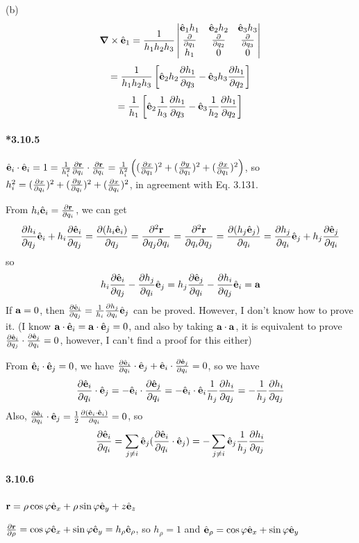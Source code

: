 \documentclass[a4paper]{article}
\begin{document}
(b) 
\[
\del\times\VE_1=\frac{1}{h_1h_2h_3}
\begin{vmatrix}
\VE_1h_1&\VE_2h_2&\VE_3h_3\\
\pdv{}{q_1}&\pdv{}{q_2}&\pdv{}{q_3}\\
h_1&0&0
\end{vmatrix}
\]
\[
=\frac{1}{h_1h_2h_3}\left[\VE_2h_2\pdv{h_1}{q_3}-\VE_3h_3\pdv{h_1}{q_2} \right]
\]
\[
=\frac{1}{h_1}\left[\VE_2\frac{1}{h_3}\pdv{h_1}{q_3}-\VE_3\frac{1}{h_2}\pdv{h_1}{q_2} \right]
\]

\paragraph{*3.10.5}
$\VE_i\cdot\VE_i=1=\frac{1}{h_i^2}\pdv{\V{r}}{q_i}\cdot\pdv{\V{r}}{q_i}=\frac{1}{h_i^2}\left((\pdv{x}{q_1})^2+(\pdv{y}{q_1})^2+(\pdv{x}{q_1})^2 \right)$, so $h_i^2=(\pdv{x}{q_i})^2+(\pdv{y}{q_i})^2+(\pdv{x}{q_i})^2$, in agreement with Eq. 3.131.

From $h_i\VE_i=\pdv{\V{r}}{q_i}$, we can get \[\pdv{h_i}{q_j}\VE_i+h_i\pdv{\VE_i}{q_j}=\pdv{(h_i\VE_i)}{q_j}=\pdv{^2\V{r}}{q_j\partial q_i}
=\pdv{^2\V{r}}{q_i\partial q_j}=\pdv{(h_j\VE_j)}{q_i}=\pdv{h_j}{q_i}\VE_j+h_j\pdv{\VE_j}{q_i}
\]
so
\[
h_i\pdv{\VE_i}{q_j}-\pdv{h_j}{q_i}\VE_j=h_j\pdv{\VE_j}{q_i}-\pdv{h_i}{q_j}\VE_i=\V{a}
\]
If $\V{a}=0$, then $\pdv{\VE_i}{q_j}=\frac{1}{h_i}\pdv{h_j}{q_i}\VE_j$ can be proved. However, I don't know how to prove it. (I know $\V{a}\cdot\VE_i=\V{a}\cdot\VE_j=0$, and also by taking $\V{a}\cdot\V{a}$, it is equivalent to prove $\pdv{\VE_i}{q_j}\cdot\pdv{\VE_j}{q_i}=0$, however, I can't find a proof for this either)

From $\VE_i\cdot\VE_j=0$, we have $\pdv{\VE_i}{q_i}\cdot\VE_j+\VE_i\cdot\pdv{\VE_j}{q_i}=0$, so we have \[\pdv{\VE_i}{q_i}\cdot\VE_j=-\VE_i\cdot\pdv{\VE_j}{q_i}=-\VE_i\cdot\VE_i\frac{1}{h_j}\pdv{h_i}{q_j}=-\frac{1}{h_j}\pdv{h_i}{q_j}\]
Also, $\pdv{\VE_i}{q_i}\cdot\VE_j=\frac{1}{2}\pdv{(\VE_i\cdot\VE_i)}{q_i}=0$, so 
\[
\pdv{\VE_i}{q_i}=\sum_{j\neq i}\VE_j(\pdv{\VE_i}{q_i}\cdot\VE_j)=-\sum_{j\neq i}\VE_j\frac{1}{h_j}\pdv{h_i}{q_j}
\]

\paragraph{3.10.6}
$\V{r}=\rho\cos\varphi\VE_x+\rho\sin\varphi\VE_y+z\VE_z$     
\medskip

$\pdv{\V{r}}{\rho}=\cos\varphi\VE_x+\sin\varphi\VE_y=h_\rho\VE_\rho$, so $h_\rho=1$ and $\VE_\rho=\cos\varphi\VE_x+\sin\varphi\VE_y$
\end{document}
